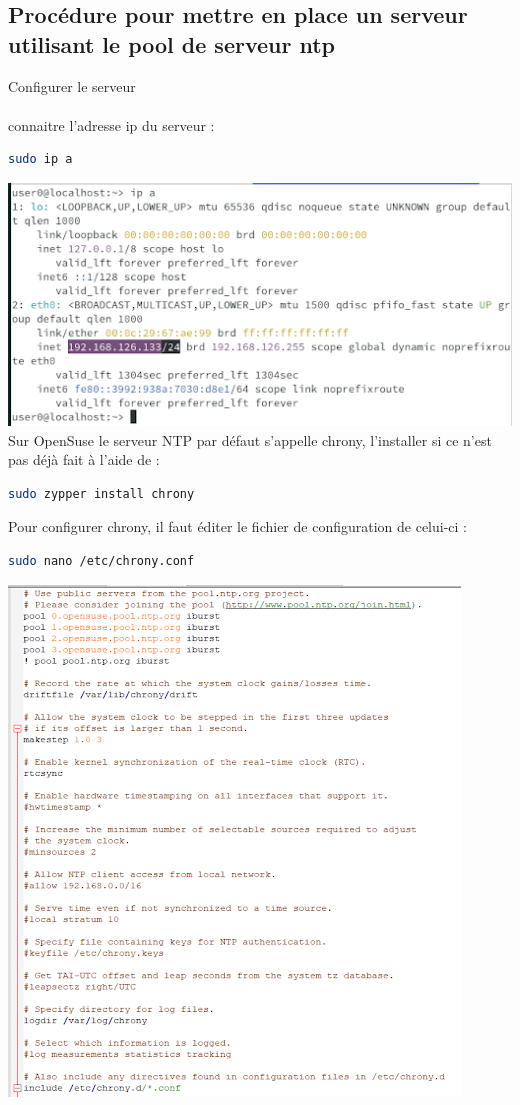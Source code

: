 \documentclass[a4paper]{article}
\begin{document}
\begin{adjustwidth}{-2cm}{-2cm}
\subsection {Procédure pour mettre en place un serveur utilisant le pool de serveur ntp}

Configurer le serveur\\ \\
\noindent connaitre l'adresse ip du serveur :
\begin{lstlisting}[language=bash]
 sudo ip a
\end{lstlisting}
\includegraphics[scale=0.7]{picture/5.png} \\

\noindent Sur OpenSuse le serveur NTP par défaut s'appelle chrony, l'installer si ce n'est pas déjà fait à l'aide de :
\begin{lstlisting}[language=bash]
 sudo zypper install chrony
\end{lstlisting}
\newpage
\noindent Pour configurer chrony, il faut éditer le fichier de configuration de celui-ci :
\begin{lstlisting}[language=bash]
 sudo nano /etc/chrony.conf
\end{lstlisting}
\includegraphics[scale=0.8]{picture/6.png} 


\end{adjustwidth}
\end{document}
